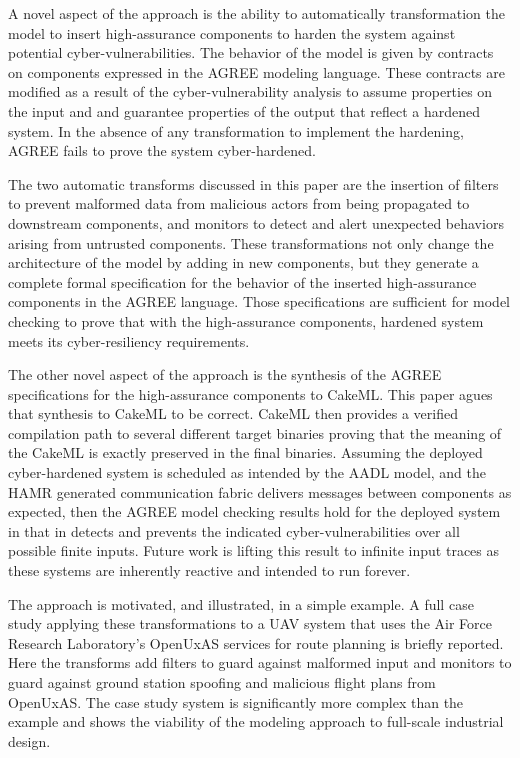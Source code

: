 A novel aspect of the approach is the ability to automatically transformation the model to insert high-assurance components to harden the system against potential cyber-vulnerabilities. The behavior of the model is given by contracts on components expressed in the AGREE modeling language. These contracts are modified as a result of the cyber-vulnerability analysis to assume properties on the input and and guarantee properties of the output that reflect a hardened system. In the absence of any transformation to implement the hardening, AGREE fails to prove the system cyber-hardened.

The two automatic transforms discussed in this paper are the insertion of filters to prevent malformed data from malicious actors from being propagated to downstream components, and monitors to detect and alert unexpected behaviors arising from untrusted components. These transformations not only change the architecture of the model by adding in new components, but they generate a complete formal specification for the behavior of the inserted high-assurance components in the AGREE language. Those specifications are sufficient for model checking to prove that with the high-assurance components, hardened system meets its cyber-resiliency requirements.

The other novel aspect of the approach is the synthesis of the AGREE specifications for the high-assurance components to CakeML. This paper agues that synthesis to CakeML to be correct. CakeML then provides a verified compilation path to several different target binaries proving that the meaning of the CakeML is exactly preserved in the final binaries. Assuming the deployed cyber-hardened system is scheduled as intended by the AADL model, and the HAMR generated communication fabric delivers messages between components as expected, then the AGREE model checking results hold for the deployed system in that in detects and prevents the indicated cyber-vulnerabilities over all possible finite inputs. Future work is lifting this result to infinite input traces as these systems are inherently reactive and intended to run forever.

The approach is motivated, and illustrated, in a simple example. A full case study applying these transformations to a UAV system that uses the Air Force Research Laboratory's OpenUxAS services for route planning is briefly reported. Here the transforms add filters to guard against malformed input and monitors to guard against ground station spoofing and malicious flight plans from OpenUxAS. The case study system is significantly more complex than the example and shows the viability of the modeling approach to full-scale industrial design.

